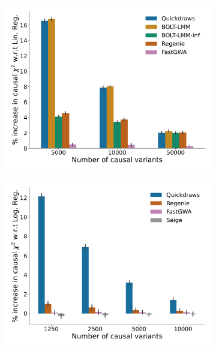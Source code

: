 \begin{figure}[h!]
    \centering
    \begin{subfigure}{.5\textwidth}
    \includegraphics[scale=0.29]{figures/sim_power/paper_result_power_50000.pdf}
    \caption{}
    \label{fig:sim2_1}
    \end{subfigure}%
    \begin{subfigure}{.5\textwidth}
    \includegraphics[scale=0.29]{figures/sim_power/paper_result_power_10000.pdf}
    \caption{}
    \label{fig:sim2_2}
    \end{subfigure}

\end{figure}
